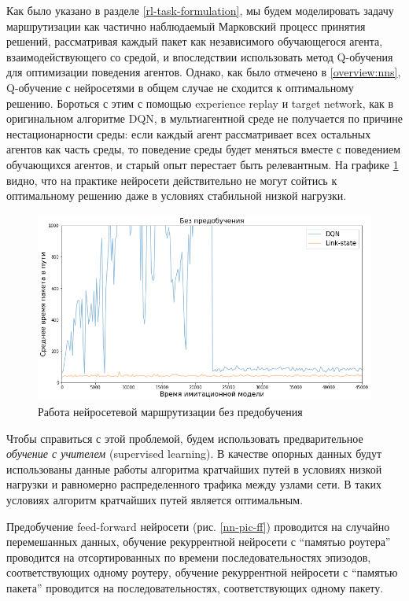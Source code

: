 \documentclass[specification, annotation]{itmo-student-thesis}
\begin{document}
Как было указано в разделе \ref{rl-task-formulation}, мы будем моделировать
задачу маршрутизации как частично наблюдаемый Марковский процесс принятия
решений, рассматривая каждый пакет как независимого обучающегося агента,
взаимодействующего со средой, и впоследствии использовать метод Q-обучения для
оптимизации поведения агентов. Однако, как было отмечено в \ref{overview:nns},
Q-обучение с нейросетями в общем случае не сходится к оптимальному решению.
Бороться с этим с помощью experience replay и target network, как в оригинальном
алгоритме DQN, в мультиагентной среде не получается по причине
нестационарности среды: если каждый агент рассматривает всех остальных агентов
как часть среды, то поведение среды будет меняться вместе с поведением
обучающихся агентов, и старый опыт перестает быть релевантным. На графике
\ref{non-convergence} видно, что на практике нейросети действительно не могут
сойтись к оптимальному решению даже в условиях стабильной низкой нагрузки.

\begin{figure}[!h]
  \caption{Работа нейросетевой маршрутизации без
    предобучения}\label{non-convergence}
  \centering
  \includegraphics[scale=0.6]{non-convergence}
\end{figure}

Чтобы справиться с этой проблемой, будем использовать предварительное
\textit{обучение с учителем} (supervised learning). В качестве опорных данных
будут использованы данные работы алгоритма кратчайших путей в условиях низкой
нагрузки и равномерно распределенного трафика между узлами сети. В таких
условиях алгоритм кратчайших путей является оптимальным.

Предобучение feed-forward нейросети (рис. \ref{nn-pic-ff}) проводится на случайно
перемешанных данных, обучение рекуррентной нейросети с ``памятью роутера''
проводится на отсортированных по времени последовательностях эпизодов,
соответствующих одному роутеру, обучение рекуррентной нейросети с ``памятью
пакета'' проводится на последовательностях, соответствующих одному пакету.
\end{document}
